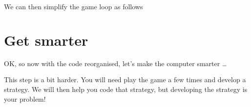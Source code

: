 \documentclass{coderdojo}
\begin{document}

\vspace{6pt}
We can then simplify the game loop as follows




\section{Get smarter}\label{sec:GetSmarter}

OK, so now with the code reorganised, let's make the computer smarter \ldots 

This step is a bit harder.  You will need play the game a few times and develop a strategy. We will then help you code that strategy, but developing the strategy is your problem!


%
% 
%
\end{document}
